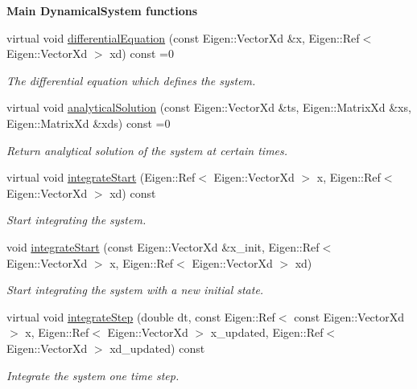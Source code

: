 \begin{Indent}{\bf Main Dynamical\+System functions}\par
\begin{DoxyCompactItemize}
\item 
virtual void \hyperlink{classDmpBbo_1_1DynamicalSystem_a70acc98a8e024f9b6e0e6de1b519e260}{differential\+Equation} (const Eigen\+::\+Vector\+Xd \&x, Eigen\+::\+Ref$<$ Eigen\+::\+Vector\+Xd $>$ xd) const =0
\begin{DoxyCompactList}\small\item\em The differential equation which defines the system. \end{DoxyCompactList}\item 
virtual void \hyperlink{classDmpBbo_1_1DynamicalSystem_ab6092038efc51ebd122e7c0878f6557d}{analytical\+Solution} (const Eigen\+::\+Vector\+Xd \&ts, Eigen\+::\+Matrix\+Xd \&xs, Eigen\+::\+Matrix\+Xd \&xds) const =0
\begin{DoxyCompactList}\small\item\em Return analytical solution of the system at certain times. \end{DoxyCompactList}\item 
virtual void \hyperlink{classDmpBbo_1_1DynamicalSystem_a44dd496535fde494d8465e7603c93db3}{integrate\+Start} (Eigen\+::\+Ref$<$ Eigen\+::\+Vector\+Xd $>$ x, Eigen\+::\+Ref$<$ Eigen\+::\+Vector\+Xd $>$ xd) const 
\begin{DoxyCompactList}\small\item\em Start integrating the system. \end{DoxyCompactList}\item 
void \hyperlink{classDmpBbo_1_1DynamicalSystem_a030a5ca35d85ecc7bd297ede70f81fb9}{integrate\+Start} (const Eigen\+::\+Vector\+Xd \&x\+\_\+init, Eigen\+::\+Ref$<$ Eigen\+::\+Vector\+Xd $>$ x, Eigen\+::\+Ref$<$ Eigen\+::\+Vector\+Xd $>$ xd)
\begin{DoxyCompactList}\small\item\em Start integrating the system with a new initial state. \end{DoxyCompactList}\item 
virtual void \hyperlink{classDmpBbo_1_1DynamicalSystem_ac7ed7ce2faa8314cd9fa5ffcccb15349}{integrate\+Step} (double dt, const Eigen\+::\+Ref$<$ const Eigen\+::\+Vector\+Xd $>$ x, Eigen\+::\+Ref$<$ Eigen\+::\+Vector\+Xd $>$ x\+\_\+updated, Eigen\+::\+Ref$<$ Eigen\+::\+Vector\+Xd $>$ xd\+\_\+updated) const 
\begin{DoxyCompactList}\small\item\em Integrate the system one time step. \end{DoxyCompactList}\end{DoxyCompactItemize}
\end{Indent}
